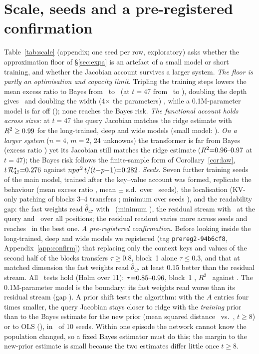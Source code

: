\section{Scale, seeds and a pre-registered confirmation}\label{sec:scale}
Table~\ref{tab:scale} (appendix; one seed per row, exploratory) asks whether the approximation floor of
\S\ref{sec:expa} is an artefact of a small model or short training, and whether the Jacobian account survives a
larger system. \emph{The floor is partly an optimisation and capacity limit.} Tripling the training steps lowers the
mean excess ratio to Bayes from \Aratio\ to \ScLongRatio\ (at $t{=}47$ from \AratioEnd\ to \ScLongRatioEnd), doubling
the depth gives \ScDeepRatio\ and doubling the width (4$\times$ the parameters) \ScWideRatio, while a 0.1M-parameter model is far off (\ScSmallRatio);
none reaches the Bayes risk. \emph{The functional account holds across sizes:} at $t{=}47$ the query Jacobian matches the
ridge estimate with $R^2\ge0.99$ for the long-trained, deep and wide models (small model: \ScSmallJacEnd). \emph{On a larger system} ($n{=}4$, $m{=}2$, 24 unknowns) the transformer is far from
Bayes (excess ratio \ScFourRatio) yet its Jacobian still matches the ridge estimate ($R^2{=}0.96\mbox{--}0.97$ at $t{=}47$);
the Bayes risk follows the finite-sample form of Corollary~\ref{cor:law}, $t\,\mathcal{R}^\star_{47}{=}0.276$ against
$np\sigma^2\,t/(t{-}p{-}1){=}0.282$. \emph{Seeds.} Seven further training seeds of the main model, trained after the key--value account was formed,
replicate the behaviour (mean excess ratio \RepRatio, mean $\pm$ s.d.\ over \RepN\ seeds), the localisation
(KV-only patching of blocks 3--4 transfers \RepKv; minimum over seeds \RepKvMin), and the readability gap: the fast
weights read $\hat\theta_{47}$ with \RepFwTheta\ (minimum \RepFwMin), the residual stream with \RepResQ\ at the query and
\RepResCtx\ over all positions; the residual readout varies more across seeds and reaches \RepResMax\ in the best one.
\emph{A pre-registered confirmation.} Before looking inside the long-trained, deep and wide models we registered
(tag \texttt{prereg2-94b6cf8}, Appendix~\ref{app:confirm}) that replacing only the context keys and values of the second half of
the blocks transfers $\tau{\ge}0.8$, block~1 alone $\tau{\le}0.3$, and that at matched dimension the fast weights read
$\hat\theta_{47}$ at least 0.15 better than the residual stream. All \CfNsix\ tests hold (Holm over 11): $\tau{=}0.85\mbox{--}0.96$,
block~1 \CfTauOne, $R^2$ \CfKv\ against \CfRes. The 0.1M-parameter model is the boundary: its fast weights read worse than
its residual stream (gap \CfSmallGap). A prior shift tests the algorithm: with the $A$ entries four times smaller, the query
Jacobian stays closer to ridge with the \emph{training} prior than to the Bayes estimate for the new prior (mean squared
distance \CfDTrain\ vs.\ \CfDNew, $t{\ge}8$) or to OLS (\CfDOls), in \CfSevenaN\ of 10 seeds. Within one episode the network
cannot know the population changed, so a fixed Bayes estimator must do this; the margin to the new-prior estimate is
small because the two estimates differ little once $t{\ge}8$.
